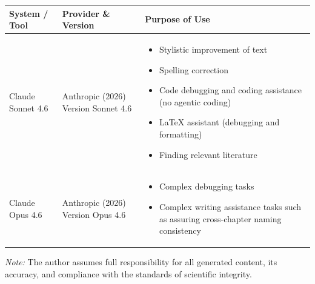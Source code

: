 \documentclass[english,11pt,a4paper,oneside]{report}
\begin{document}
	\begin{table}[H]
		\centering
		\begin{tabular}{@{} p{2.5cm} p{3.5cm} p{7cm} @{}}
			\toprule
			\textbf{System / Tool} & \textbf{Provider \& Version} & 
			\textbf{Purpose of Use} \\
			\midrule
			Claude Sonnet 4.6 & Anthropic (2026) \newline Version Sonnet 4.6 &
			\begin{itemize}[noitemsep, topsep=0pt, leftmargin=*]
				\item Stylistic improvement of text
				\item Spelling correction
				\item Code debugging and coding assistance (no agentic coding)
				\item \LaTeX{} assistant (debugging and formatting)
				\item Finding relevant literature
			\end{itemize} \\
			\addlinespace
			Claude Opus 4.6 & Anthropic (2026) \newline Version Opus 4.6 &
			\begin{itemize}[noitemsep, topsep=0pt, leftmargin=*]
				\item Complex debugging tasks
				\item Complex writing assistance tasks such as assuring 
				cross-chapter naming consistency
			\end{itemize} \\
			\bottomrule
		\end{tabular}
	\end{table}
	
	\vspace{0.5em}
	\noindent\textit{Note:} The author assumes full responsibility for all 
	generated content, its accuracy, and compliance with the standards of 
	scientific integrity.
	
\end{document}
